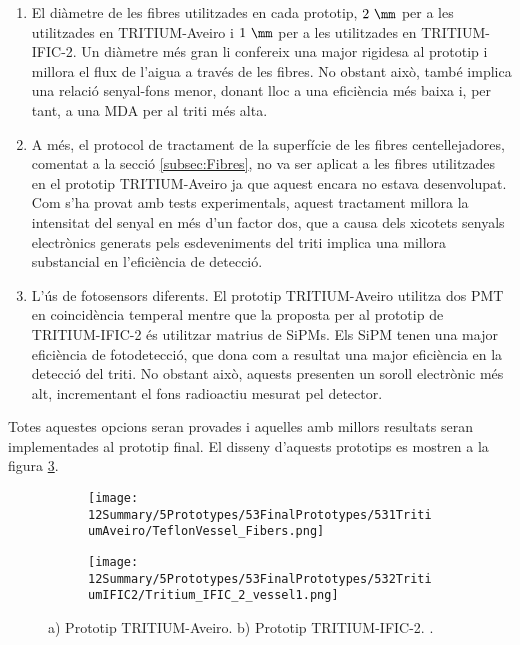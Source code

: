 \begin{enumerate}

\item{} El diàmetre de les fibres utilitzades en cada prototip, $2~\mm$ per a les utilitzades en TRITIUM-Aveiro i $1~\mm$ per a les utilitzades en TRITIUM-IFIC-2. Un diàmetre més gran li confereix una major rigidesa al prototip i millora el flux de l'aigua a través de les fibres. No obstant això, també implica una relació senyal-fons menor, donant lloc a una eficiència més baixa i, per tant, a una MDA per al triti més alta.

\item{} A més, el protocol de tractament de la superfície de les fibres centellejadores, comentat a la secció \ref{subsec:Fibres}, no va ser aplicat a les fibres utilitzades en el prototip TRITIUM-Aveiro ja que aquest encara no estava desenvolupat. Com s'ha provat amb tests experimentals, aquest tractament millora la intensitat del senyal en més d'un factor dos, que a causa dels xicotets senyals electrònics generats pels esdeveniments del triti implica una millora substancial en l'eficiència de detecció.


\item{} L'ús de fotosensors diferents. El prototip TRITIUM-Aveiro utilitza dos PMT en coincidència temperal mentre que la proposta per al prototip de TRITIUM-IFIC-2 és utilitzar matrius de SiPMs. Els SiPM tenen una major eficiència de fotodetecció, que dona com a resultat una major eficiència en la detecció del triti. No obstant això, aquests presenten un soroll electrònic més alt, incrementant el fons radioactiu mesurat pel detector. %

\end{enumerate} 

Totes aquestes opcions seran provades i aquelles amb millors resultats seran implementades al prototip final. El disseny d'aquests prototips es mostren a la figura \ref{fig:PrototipsAveiroIFIC2}.

\begin{figure}
\centering
    \begin{subfigure}[b]{0.5\textwidth}
    \centering
    \texttt{[image: 12Summary/5Prototypes/53FinalPrototypes/531TritiumAveiro/TeflonVessel\_Fibers.png]}  
        \caption{}\label{subfig:PrototipAveiro}
    \end{subfigure}
    \hfill
    \begin{subfigure}[b]{0.5\textwidth}
    \centering
    \texttt{[image: 12Summary/5Prototypes/53FinalPrototypes/532TritiumIFIC2/Tritium\_IFIC\_2\_vessel1.png]}  
    \caption{\label{subfig:PrototipIFIC2}}
    \end{subfigure}
\caption{a) Prototip TRITIUM-Aveiro. b) Prototip TRITIUM-IFIC-2. \label{fig:PrototipsAveiroIFIC2}.}
\end{figure}

